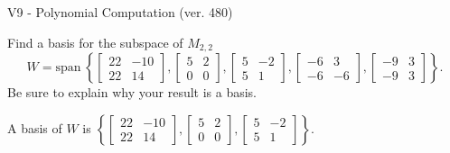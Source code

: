 \begin{exercise}
  \begin{exerciseTitle}V9 - Polynomial Computation (ver. 480)\end{exerciseTitle}
  \begin{exerciseStatement}
    Find a basis for the subspace of \(M_{2,2}\) 
\[W=\mathrm{span}\ \left\{\left[\begin{array}{cc}
22 & -10 \\
22 & 14
\end{array}\right] , \left[\begin{array}{cc}
5 & 2 \\
0 & 0
\end{array}\right] , \left[\begin{array}{cc}
5 & -2 \\
5 & 1
\end{array}\right] , \left[\begin{array}{cc}
-6 & 3 \\
-6 & -6
\end{array}\right] , \left[\begin{array}{cc}
-9 & 3 \\
-9 & 3
\end{array}\right]\right\}.\]
 Be sure to explain why your result is a basis.


  \end{exerciseStatement}
  \begin{exerciseAnswer}
   A basis of \(W\) is  \(\left\{\left[\begin{array}{cc}
22 & -10 \\
22 & 14
\end{array}\right] , \left[\begin{array}{cc}
5 & 2 \\
0 & 0
\end{array}\right] , \left[\begin{array}{cc}
5 & -2 \\
5 & 1
\end{array}\right]\right\}\).
  


  \end{exerciseAnswer}
\end{exercise}